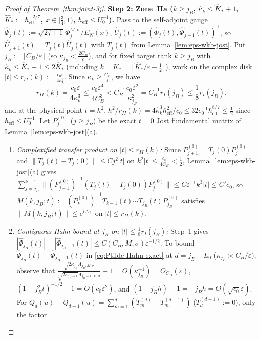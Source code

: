 \documentclass[11pt]{article}
\theoremstyle{definition}
\theoremstyle{remark}
\newcommand{\heff}{\hbar_{\mathrm{eff}}}
\renewcommand{\_}{\oldunderscore\penalty0\hskip0pt\relax}
\begin{document}
\begin{proof}[Proof of Theorem~\ref{thm:joint-3j}]
\medskip
\noindent\textbf{Step 2: Zone~IIa ($k\ge j_B$, $\hat{\kappa}_k\le\hat{K}_*+1$, $\hat{K}_*:=\heff^{-2/7}$, $x\in[\frac34,1)$, $\heff\le U_0^{-1}$).}
Pass to the self-adjoint gauge $\widehat{\Phi}_j(t):=\sqrt{2j+1}\,\Phi_j^{M,\sigma}/E_N(x)$,
  $\widehat{U}_j(t):=(\widehat{\Phi}_j(t),\widehat{\Phi}_{j-1}(t))^{\mathsf{T}}$, so
  $\widehat{U}_{j+1}(t)=T_j(t)\widehat{U}_j(t)$ with $T_j(t)$ from Lemma~\ref{lem:eps-wkb-jost}. Put $j_B:=\lceil
  C_B/\varepsilon\rceil$ (so $\kappa_{j_B}<\frac{2C_B}{\varepsilon}$), and for fixed target rank $k\ge j_B$ with
  $\hat{\kappa}_k\le\hat{K}_*+1\le 2\hat{K}_*$ (including $k=K_*=\lceil\hat{K}_*/\varepsilon-\frac12\rceil$), work on the complex
  disk $|t|\le r_{II}(k):=\frac{c_0\varepsilon}{4\kappa_k^3}$. Since $\kappa_k\ge\frac{C_B}{\varepsilon}$, we have
\begin{equation}
  r_{II}(k) = \frac{c_0\varepsilon}{4\kappa_k^3} \le \frac{c_0\varepsilon^4}{4C_B^3} < C_B^{-1}\frac{c_0\varepsilon^2}{\kappa_{j_B}^2} = C_B^{-1}r_I(j_B) \le \frac18 r_I(j_B),
\end{equation}
and at the physical point $t=h^2$, $h^2/r_{II}(k)=4\hat{\kappa}_k^3\heff^2/c_0\le 32c_0^{-1}\heff^{8/7}\le\frac12$ since
  $\heff\le U_0^{-1}$. Let $P_j^{(0)}$ ($j\ge j_B$) be the exact $t=0$ Jost fundamental matrix of
  Lemma~\ref{lem:eps-wkb-jost}(a).
\begin{enumerate}[leftmargin=2em,itemsep=2pt]
\item \emph{Complexified transfer product on $|t|\le r_{II}(k)$:} Since $P_{j+1}^{(0)}=T_j(0)P_j^{(0)}$ and $\|T_j(t)-T_j(0)\|\le
  Cj^2|t|$ on $k^2|t|\le\frac{c_0}{4C_B}<\frac12$, Lemma~\ref{lem:eps-wkb-jost}(a) gives
  $\sum_{j=j_B}^{k-1}\|(P_{j+1}^{(0)})^{-1}(T_j(t)-T_j(0))P_j^{(0)}\|\le C\varepsilon^{-1}k^3|t|\le C'c_0$, so
  $M(k,j_B;t):=(P_k^{(0)})^{-1}T_{k-1}(t)\cdots T_{j_B}(t)P_{j_B}^{(0)}$ satisfies $\|M(k,j_B;t)\|\le\mathrm{e}^{C'c_0}$ on
  $|t|\le r_{II}(k)$.
\item \emph{Contiguous Hahn bound at $j_B$ on $|t|\le\frac18 r_I(j_B)$:} Step~1 gives
  $|\widehat{\Phi}_{j_B}(t)|+|\widehat{\Phi}_{j_B-1}(t)|\le C(C_B,M,\sigma)\varepsilon^{-1/2}$. To bound
  $\widehat{\Phi}_{j_B}(t)-\widehat{\Phi}_{j_B-1}(t)$ in \eqref{eq:Ptilde-Hahn-exact} at $d=j_B-L_0$ ($\kappa_{j_B}\asymp
  C_B/\varepsilon$), observe that
  $\frac{\sqrt{2\kappa_{j_B}}\Lambda_{j_B,M,\sigma}}{\sqrt{2\kappa_{j_B-1}}\Lambda_{j_B-1,M,\sigma}}-1=O(\kappa_{j_B}^{-1})=O_{C_B}(\varepsilon)$,
  $(1-j_B^2 t)^{-1/2}-1=O(c_0\varepsilon^2)$, and $(1-j_B h)-1=-j_B h=O(\sqrt{c_0}\varepsilon)$. For
  $Q_d(u)-Q_{d-1}(u)=\sum_{m=1}^d(T_m^{(d)}-T_m^{(d-1)})$ ($T_d^{(d-1)}:=0$), only the factor

\end{enumerate}
\end{proof}
\end{document}
